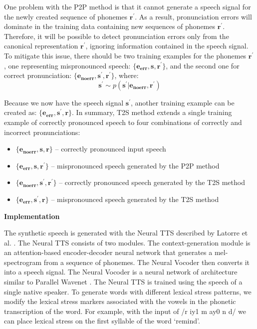 \documentclass[]{interact}
\theoremstyle{plain}%
\theoremstyle{definition}
\theoremstyle{remark}
\begin{document}
One problem with the P2P method is that it cannot generate a speech signal for the newly created sequence of phonemes $\mathbf{r^{'}}$. As a result, pronunciation errors will dominate in the training data containing new sequences of phonemes $\mathbf{r^{'}}$. Therefore, it will be possible to detect pronunciation errors only from the canonical representation $\mathbf{r^{'}}$, ignoring information contained in the speech signal. To mitigate this issue, there should be two training examples for the phonemes $\mathbf{r^{'}}$, one representing mispronounced speech: $\{\mathbf{e_{err}}, \mathbf{s},\mathbf{r^{'}}\}$, and the second one for correct pronunciation: $\{\mathbf{e_{noerr}}, \mathbf{s^{'}},\mathbf{r^{'}}\}$, where: 
\begin{equation}
 \mathbf{s^{'}} \sim p(\mathbf{s^{'}}|\mathbf{e_{noerr}},\mathbf{r^{'}})
\end{equation}

Because we now have the speech signal $\mathbf{s^{'}}$, another training example can be created as: $\{\mathbf{e_{err}}, \mathbf{s^{'}},\mathbf{r}\}$. In summary, T2S method extends a single training example of correctly pronounced speech to four combinations of correctly and incorrect pronunciations: 
\begin{itemize}
\item $\{\mathbf{e_{noerr}}, \mathbf{s},\mathbf{r}\}$ -- correctly pronounced input speech

\item $\{\mathbf{e_{err}}, \mathbf{s},\mathbf{r^{'}}\}$ -- mispronounced speech generated by the P2P method

\item $\{\mathbf{e_{noerr}}, \mathbf{s^{'}},\mathbf{r^{'}}\}$ -- correctly pronounced speech generated by the T2S method

\item $\{\mathbf{e_{err}}, \mathbf{s^{'}},\mathbf{r}\}$ --  mispronounced speech generated by the T2S method
\end{itemize}

\bigskip

\textbf{Implementation}

\bigskip

The synthetic speech is generated with the Neural TTS described by Latorre et al. \cite{latorre2019effect}. The Neural TTS consists of two modules. The context-generation module is an attention-based encoder-decoder neural network that generates a mel-spectrogram from a sequence of phonemes. The Neural Vocoder then converts it into a speech signal. The Neural Vocoder is a neural network of architecture similar to Parallel Wavenet \cite{oord2018parallel}. The Neural TTS is trained using the speech of a single native speaker. To generate words with different lexical stress patterns, we modify the lexical stress markers associated with the vowels in the phonetic transcription of the word. For example, with the input of /r iy1 m ay0 n d/ we can place lexical stress on the first syllable of the word `remind'.
\end{document}

